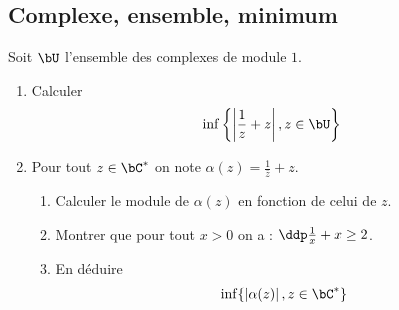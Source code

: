 \subsection{Complexe, ensemble, minimum}


\begin{exercice}
Soit $\bU$ l'ensemble des complexes de module $1$. 
\begin{enumerate}
\item Calculer 
$$\inf \left\{ \left| \frac{1}{z}+z\right| , z \in \bU\right\}$$

\item Pour tout $z\in \bC^*$ on note  $\alpha(z)= \frac{1}{\bar{z}}+z$. 
\begin{enumerate}
\item Calculer le module de $\alpha(z)$ en fonction de celui de $z$. 
\item Montrer que pour tout $x>0$ on a : $\ddp \frac{1}{x}+x\geq 2$.
\item En déduire 
$$\inf\{ \left| \alpha(z)\right| , z \in \bC^*\}$$
\end{enumerate}
\end{enumerate}
\end{exercice}


